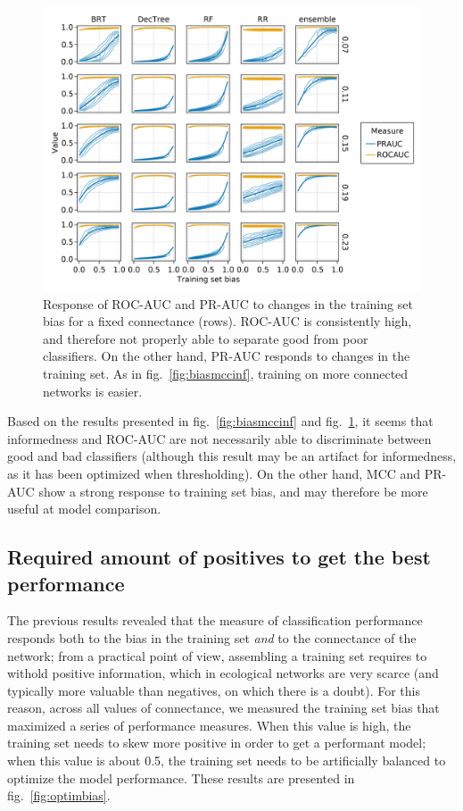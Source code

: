\documentclass[11pt]{article}
\makeatletter
\def\maxwidth{\ifdim\Gin@nat@width>\linewidth\linewidth
\else\Gin@nat@width\fi}
\let\Oldincludegraphics\includegraphics
\renewcommand{\includegraphics}[1]{\Oldincludegraphics[width=\maxwidth]{#1}}
\makeatother
\begin{document}
\begin{figure}
\hypertarget{fig:biasrocpr}{%
\centering
\includegraphics{figures/bias_roc_pr.png}
\caption{Response of ROC-AUC and PR-AUC to changes in the training set
bias for a fixed connectance (rows). ROC-AUC is consistently high, and
therefore not properly able to separate good from poor classifiers. On
the other hand, PR-AUC responds to changes in the training set. As in
fig.~\ref{fig:biasmccinf}, training on more connected networks is
easier.}\label{fig:biasrocpr}
}
\end{figure}

Based on the results presented in fig.~\ref{fig:biasmccinf} and
fig.~\ref{fig:biasrocpr}, it seems that informedness and ROC-AUC are not
necessarily able to discriminate between good and bad classifiers
(although this result may be an artifact for informedness, as it has
been optimized when thresholding). On the other hand, MCC and PR-AUC
show a strong response to training set bias, and may therefore be more
useful at model comparison.

\hypertarget{required-amount-of-positives-to-get-the-best-performance}{%
\subsection{Required amount of positives to get the best
performance}\label{required-amount-of-positives-to-get-the-best-performance}}

The previous results revealed that the measure of classification
performance responds both to the bias in the training set \emph{and} to
the connectance of the network; from a practical point of view,
assembling a training set requires to withold positive information,
which in ecological networks are very scarce (and typically more
valuable than negatives, on which there is a doubt). For this reason,
across all values of connectance, we measured the training set bias that
maximized a series of performance measures. When this value is high, the
training set needs to skew more positive in order to get a performant
model; when this value is about 0.5, the training set needs to be
artificially balanced to optimize the model performance. These results
are presented in fig.~\ref{fig:optimbias}.
\end{document}
